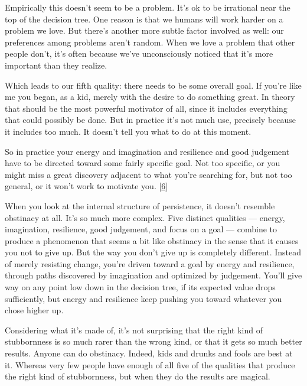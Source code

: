 Empirically this doesn't
                  seem to be a problem. It's ok to be irrational near the top of
                  the decision tree. One reason is that we humans will work
                  harder on a problem we love. But there's another more subtle
                  factor involved as well: our preferences among problems aren't
                  random. When we love a problem that other people don't, it's
                  often because we've unconsciously noticed that it's more
                  important than they realize.

Which leads to our
                  fifth quality: there needs to be some overall goal. If you're
                  like me you began, as a kid, merely with the desire to do
                  something great. In theory that should be the most powerful
                  motivator of all, since it includes everything that could
                  possibly be done. But in practice it's not much use, precisely
                  because it includes too much. It doesn't tell you what to do
                  at this moment.

So in practice your energy and
                  imagination and resilience and good judgement have to be
                  directed toward some fairly specific goal. Not too specific,
                  or you might miss a great discovery adjacent to what you're
                  searching for, but not too general, or it won't work to
                  motivate you.
                  [\href{\#f6n}{6}]

When you look at the internal structure of
                  persistence, it doesn't resemble obstinacy at all. It's so
                  much more complex. Five distinct qualities --- energy,
                  imagination, resilience, good judgement, and focus on a goal
                  --- combine to produce a phenomenon that seems a bit like
                  obstinacy in the sense that it causes you not to give up. But
                  the way you don't give up is completely different. Instead of
                  merely resisting change, you're driven toward a goal by energy
                  and resilience, through paths discovered by imagination and
                  optimized by judgement. You'll give way on any point low down
                  in the decision tree, if its expected value drops
                  sufficiently, but energy and resilience keep pushing you
                  toward whatever you chose higher up.

Considering
                  what it's made of, it's not surprising that the right kind of
                  stubbornness is so much rarer than the wrong kind, or that it
                  gets so much better results. Anyone can do obstinacy. Indeed,
                  kids and drunks and fools are best at it. Whereas very few
                  people have enough of all five of the qualities that produce
                  the right kind of stubbornness, but when they do the results
                  are magical.








